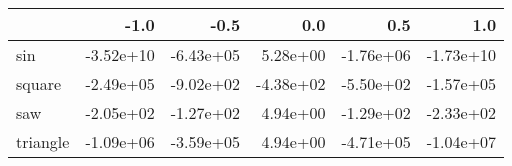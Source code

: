 \begin{tabular}{lrrrrr}
\toprule
{} &      -1.0 &      -0.5 &       0.0 &       0.5 &       1.0 \\
\midrule
sin      & -3.52e+10 & -6.43e+05 &  5.28e+00 & -1.76e+06 & -1.73e+10 \\
square   & -2.49e+05 & -9.02e+02 & -4.38e+02 & -5.50e+02 & -1.57e+05 \\
saw      & -2.05e+02 & -1.27e+02 &  4.94e+00 & -1.29e+02 & -2.33e+02 \\
triangle & -1.09e+06 & -3.59e+05 &  4.94e+00 & -4.71e+05 & -1.04e+07 \\
\bottomrule
\end{tabular}
